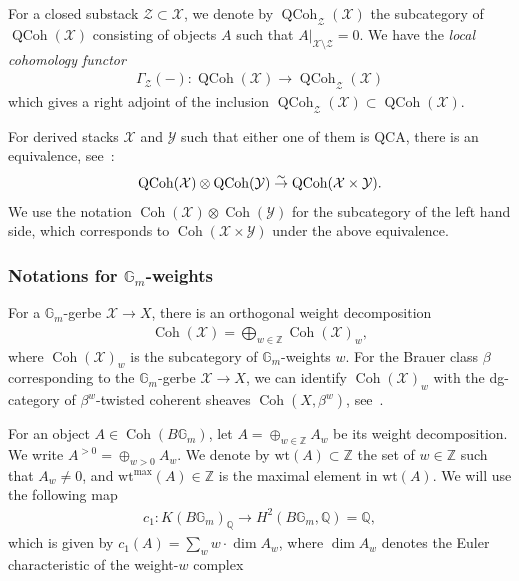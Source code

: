 \documentclass[11pt,oneside,a4paper,mathscr]{amsart}
\theoremstyle{definition}
\newcommand{\Y}{\mathcal{Y}}
\newcommand{\zZ}{\mathcal{Z}}
\newcommand{\QCoh}{\operatorname{QCoh}}
\newcommand{\X}{\mathcal{X}}
\newcommand{\bgm}{B\mathbb{G}_m}
\newcommand{\Coh}{\operatorname{Coh}}
\newcommand{\wt}{\mathrm{wt}}
\begin{document}
For a closed substack $\zZ \subset \X$, we denote by $\QCoh_{\zZ}(\X)$ 
the subcategory of $\QCoh(\X)$ consisting of objects $A$ such that 
$A|_{\mathcal{X}\setminus \mathcal{Z}}=0$. 
We have the \textit{local cohomology functor}
\begin{align}\label{loc:coh}
    \Gamma_{\mathcal{Z}}(-) \colon \QCoh(\X) \to \QCoh_{\mathcal{Z}}(\X)
\end{align}
which gives a right adjoint of the inclusion $\QCoh_{\mathcal{Z}}(\X) \subset \QCoh(\X)$. 

For derived stacks $\mathcal{X}$ and $\mathcal{Y}$ such that either one of them is QCA, there is an equivalence, 
see~\cite[Corollary~4.3.4]{MR3037900}:
\begin{align}\notag
    \QCoh(\mathcal{X})\otimes \QCoh(\mathcal{Y}) \stackrel{\sim}{\to}\QCoh(\mathcal{X}\times \mathcal{Y}).
\end{align}
We use the notation $\Coh(\X) \otimes \Coh(\Y)$ for the subcategory of the left 
hand side, which corresponds to $\Coh(\X\times \Y)$ 
under the above equivalence. 



\subsubsection*{\texorpdfstring{Notations for $\mathbb{G}_m$-weights}{Notation on Gm-weights}}\label{subsec:Gmwt}
For a $\mathbb{G}_m$-gerbe $\X \to X$, there is an orthogonal weight 
decomposition 
\begin{align*}
    \Coh(\X)=\bigoplus_{w\in \mathbb{Z}}\Coh(\X)_w,
\end{align*}
where $\Coh(\X)_w$ is the subcategory of $\mathbb{G}_m$-weights $w$. 
For the Brauer class $\beta$ corresponding to the $\mathbb{G}_m$-gerbe $\X \to X$, 
we can identify $\Coh(\X)_w$ with the dg-category of $\beta^w$-twisted coherent sheaves 
$\Coh(X, \beta^w)$, see~\cite[Section~2.1.3]{MR2309155}.

For an object $A \in \Coh(\bgm)$,
let $A=\oplus_{w\in \mathbb{Z}} A_w$ 
be its weight decomposition. We write $A^{>0}=\oplus_{w>0} A_w$. 
We denote by $\wt(A)\subset \mathbb{Z}$ the set of $w\in \mathbb{Z}$ such that $A_w\neq 0$, 
and $\wt^{\mathrm{max}}(A)\in \mathbb{Z}$ is the maximal element in $\wt(A)$. 
We will use the following map 
\begin{align*}
c_1 \colon K(\bgm)_{\mathbb{Q}} \to H^2(\bgm, \mathbb{Q})=\mathbb{Q}, 
\end{align*}
which is given by $c_1(A)=\sum_w w \cdot \dim A_w$, where $\dim A_w$ denotes the Euler characteristic of the weight-$w$ complex
\end{document}
